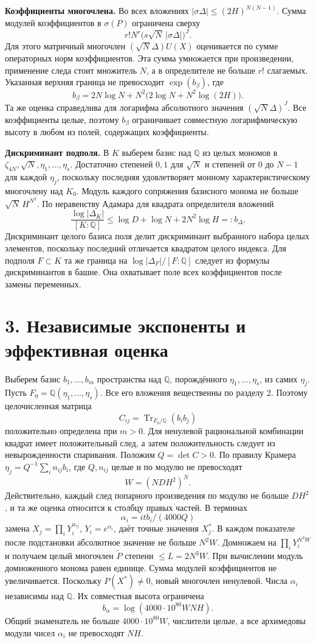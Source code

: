 \documentclass[11pt,a4paper]{article}
\newcommand{\Tr}{\operatorname{Tr}}
\newcommand{\sect}[1]{\section*{\sffamily\color{ink}#1}}
\newcommand{\subt}[1]{\par\medskip\noindent\textbf{#1.}\quad}
\newcommand{\QQ}{\mathbb Q}
\begin{document}
\subt{Коэффициенты многочлена}
Во всех вложениях \(|\sigma\Delta|\le(2H)^{N(N-1)}\). Сумма модулей коэффициентов в \(\sigma(P)\) ограничена сверху
\[
  r!N^r\bigl(s\sqrt N\,|\sigma\Delta|\bigr)^J.
\]
Для этого матричный многочлен \((\sqrt N\Delta)U(X)\) оценивается по сумме операторных норм коэффициентов. Эта сумма умножается при произведении, применение следа стоит множитель \(N\), а в определителе не больше \(r!\) слагаемых. Указанная верхняя граница не превосходит \(\exp(b_\beta)\), где
\[
       b_\beta=2N\log N+
                N^2\bigl(2\log N+N^2\log(2H)\bigr).
\]
Та же оценка справедлива для логарифма абсолютного значения \((\sqrt N\Delta)^J\). Все коэффициенты целые, поэтому \(b_\beta\) ограничивает совместную логарифмическую высоту в любом из полей, содержащих коэффициенты.

\subt{Дискриминант подполя}
В \(K\) выберем базис над \(\QQ\) из целых мономов в \(\zeta_{4N},\sqrt N,\eta_1,\ldots,\eta_s\). Достаточно степеней \(0,1\) для \(\sqrt N\) и степеней от \(0\) до \(N-1\) для каждой \(\eta_j\), поскольку последняя удовлетворяет монному характеристическому многочлену над \(K_0\). Модуль каждого сопряжения базисного монома не больше \(\sqrt N\,H^{N^2}\). По неравенству Адамара для квадрата определителя вложений
\[
  \frac{\log|\Delta_K|}{[K:\QQ]}
                 \le \log D+\log N+2N^2\log H=:b_\Delta .
\]
Дискриминант целого базиса поля делит дискриминант выбранного набора целых элементов, поскольку последний отличается квадратом целого индекса. Для подполя \(F\subset K\) та же граница на \(\log|\Delta_F|/[F:\QQ]\) следует из формулы дискриминантов в башне. Она охватывает поле всех коэффициентов после замены переменных.

\newpage
\sect{3. Независимые экспоненты и эффективная оценка}
Выберем базис \(b_1,\ldots,b_m\) пространства над \(\QQ\), порождённого \(\eta_1,\ldots,\eta_s\), из самих \(\eta_j\). Пусть \(F_0=\QQ(\eta_1,\ldots,\eta_s)\). Все его вложения вещественны по разделу 2. Поэтому целочисленная матрица
\[
   C_{ij}=\Tr_{F_0/\QQ}(b_i b_j)
\]
положительно определена при \(m>0\). Для ненулевой рациональной комбинации квадрат имеет положительный след, а затем положительность следует из невырожденности спаривания. Положим \(Q=\det C>0\). По правилу Крамера \(\eta_j=Q^{-1}\sum_i n_{ij}b_i\), где \(Q,n_{ij}\) целые и по модулю не превосходят
\[
               W=(N D H^2)^N.
\]
Действительно, каждый след попарного произведения по модулю не больше \(D H^2\), и та же оценка относится к столбцу правых частей. В терминах
\[
  \alpha_i=itb_i/(4000Q)
\]
замена \(X_j=\prod_iY_i^{n_{ij}}\), \(Y_i=e^{\alpha_i}\), даёт точные значения \(X_j^*\). В каждом показателе после подстановки абсолютное значение не больше \(N^2 W\). Домножаем на \(\prod_iY_i^{N^2W}\) и получаем целый многочлен \(\widetilde P\) степени \(\le L=2N^3 W\). При вычислении модуль домноженного монома равен единице. Сумма модулей коэффициентов не увеличивается. Поскольку \(P(X^*)\ne0\), новый многочлен ненулевой. Числа \(\alpha_i\) независимы над \(\QQ\). Их совместная высота ограничена
\[
 b_\alpha=\log(4000\cdot10^{80}WNH).
\]
Общий знаменатель не больше \(4000\cdot10^{80}W\), числители целые, а все архимедовы модули чисел \(\alpha_i\) не превосходят \(NH\).
\end{document}
